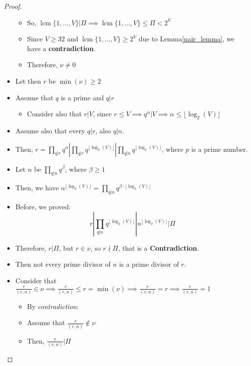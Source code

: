 \begin{proof}
\begin{itemize}
\begin{itemize}
            \item So, $\operatorname{lcm}\{1, \dots, V\} | \Pi \implies \operatorname{lcm}\{1, \dots, V\} \leq \Pi < 2^{V}$
            \item Since $V \geq 32$ and $\operatorname{lcm}\{1, \dots, V\} \geq 2^{V}$ due to Lemma\ref{nair_lemma}, we have a \textbf{contradiction}.
            \item Therefore, $\nu \neq 0$
        \end{itemize}
        \item Let then $r$ be $\operatorname{min}(\nu) \geq 2$
        \item Assume that $q$ is a prime and $q | r$
        \begin{itemize}
            \item Consider also that $r | V$, since $r \leq V \implies q^{\alpha} | V \implies \alpha \leq \lfloor \operatorname{log}_{2}(V) \rfloor$
        \end{itemize}
        \item Assume also that every $q | r$, also $q | n$.
        \item Then, $r = \prod_{q | r} q^{\alpha} | \prod_{q | r} q^{\lfloor \operatorname{log}_{2}(V) \rfloor} | \prod_{q | n} q^{\lfloor \operatorname{log}_{2}(V) \rfloor}$,  where $p$ is a prime number.
        \item Let $n$ be $\prod_{q | n} q^{\beta}$, where $\beta \geq 1$
        \item Then, we have $n^{\lfloor \operatorname{log}_{2}(V) \rfloor} = \prod_{q | n} q^{\beta \cdot \lfloor \operatorname{log}_{2}(V) \rfloor}$
        \item Before, we proved:
        \[r | \prod_{q | n} q^{\lfloor \operatorname{log}_{2}(V) \rfloor} | n^{\lfloor \operatorname{log}_{2}(V) \rfloor} | \Pi\]
        \item Therefore, $r | \Pi$, but $r \in \nu$, so $r \nmid \Pi$, that is a \textbf{Contradiction}.
        \item Then not every prime divisor of $n$ is a prime divisor of $r$.
        \item Consider that $\frac{r}{(r,n)} \in \nu \implies \frac{r}{(r,n)} \leq r = \operatorname{min}(\nu) \implies \frac{r}{(r,n)} = r \implies \frac{r}{(r,n)} = 1$
        \begin{itemize}
            \item By \emph{contradiction}:
            \item Assume that $\frac{r}{(r,n)} \not\in \nu$
            \item Then, $\frac{r}{(r,n)} | \Pi$

\end{itemize}
\end{itemize}
\end{proof}
